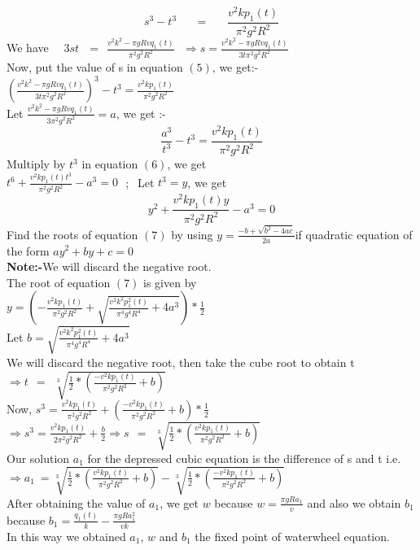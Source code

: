 \documentclass[12pt]{article}
\begin{document}
\begin{equation}
s^3-t^3~~~~~~~=~~~~~~~\frac{v^2kp_1(t)}{\pi^2 g^2R^2}
\end{equation}
We have ~~$3st~~~=~~\frac{v^2k^2-\pi gRvq_1(t)}{\pi^2 g^2R^2}~~~\Rightarrow s=\frac{v^2k^2-\pi gRvq_1(t)}{3t\pi^2 g^2R^2}$\\
Now, put the value of s in equation $(5)$, we get:-\\
$(\frac{v^2k^2-\pi gRvq_1(t)}{3t\pi^2 g^2R^2})^3-t^3=\frac{v^2kp_1(t)}{\pi^2 g^2R^2}$\\
Let $ \frac{v^2k^2-\pi gRvq_1(t)}{3\pi^2 g^2R^2}=a$,  we get :-\\
\begin{equation}
\frac{a^3}{t^3}-t^3=\frac{v^2kp_1(t)}{\pi^2 g^2R^2}
\end{equation}
Multiply by $t^3$ in equation $(6)$, we get\\
$ t^6+\frac{v^2kp_1(t)t^3}{\pi^2 g^2R^2}-a^3=0~~~$;$~~$ Let $t^3=y$, we get \\
\begin{equation}
y^2+\frac{v^2kp_1(t)y}{\pi^2 g^2R^2}-a^3=0
\end{equation}
Find the roots of equation $(7)$ by using $y=\frac{-b+\sqrt{b^2-4ac}}{2a}$if quadratic equation of the form $ay^2+by+c=0$\\
\textbf{Note:-}We will discard the negative root.\\
The root of equation $(7)$ is given by\\
$y=(-\frac{v^2kp_1(t)}{\pi^2 g^2R^2}+ \sqrt{\frac{v^2k^2p_1^2(t)}{\pi^4 g^4R^4}+4a^3})*\frac{1}{2}$\\
Let $b=\sqrt{\frac{v^2k^2p_1^2(t)}{\pi^4 g^4R^4}+4a^3}$\\
We will discard the negative root, then take the cube root to obtain t\\
$ \Rightarrow t ~~=~~\sqrt[3]{\frac{1}{2}*(\frac{-v^2kp_1(t)}{\pi^2g^2R^2}+b)} $\\
Now, $ s^3=\frac{v^2kp_1(t)}{\pi^2g^2R^2}+ (\frac{-v^2kp_1(t)}{\pi^2g^2R^2}+b)*\frac{1}{2}$\\
$ \Rightarrow s^3=\frac{v^2kp_1(t)}{2\pi^2g^2R^2}+\frac{b}{2} \Rightarrow s ~~=~~\sqrt[3]{\frac{1}{2}*(\frac{v^2kp_1(t)}{\pi^2g^2R^2}+b)}$\\
Our solution $a_1$ for the depressed cubic equation is the difference of s and t i.e.\\
$\Rightarrow a_1~=\sqrt[3]{\frac{1}{2}*(\frac{v^2kp_1(t)}{\pi^2g^2R^2}+b)}-\sqrt[3]{\frac{1}{2}*(\frac{-v^2kp_1(t)}{\pi^2g^2R^2}+b)}$\\
After obtaining the value of $a_1$, we get $w$ because $w=\frac{\pi gRa_1}{v}$ and also we obtain $b_1$ because $ b_1=\frac{q_1(t)}{k}-\frac{\pi gRa_1^2}{vk}$\\
In this way we obtained $a_1$, $w$ and $b_1$ the fixed point of waterwheel equation.\\
\end{document}
